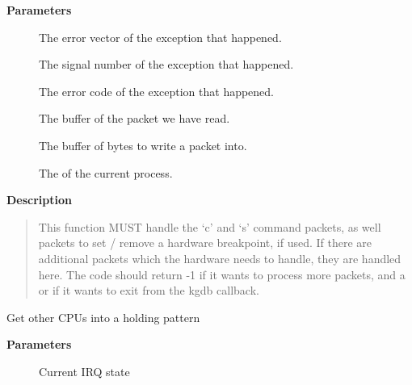 \documentclass[a4paper,8pt,english]{sphinxmanual}
\begin{document}
\textbf{Parameters}
\begin{description}
\item[{}] \leavevmode
The error vector of the exception that happened.

\item[{}] \leavevmode
The signal number of the exception that happened.

\item[{}] \leavevmode
The error code of the exception that happened.

\item[{}] \leavevmode
The buffer of the packet we have read.

\item[{}] \leavevmode
The buffer of  bytes to write a packet into.

\item[{}] \leavevmode
The  of the current process.

\end{description}

\textbf{Description}
\begin{quote}

This function MUST handle the `c' and `s' command packets,
as well packets to set / remove a hardware breakpoint, if used.
If there are additional packets which the hardware needs to handle,
they are handled here.  The code should return -1 if it wants to
process more packets, and a  or  if it wants to exit from the
kgdb callback.
\end{quote}

\begin{fulllineitems}
\label{dev-tools/kgdb:c.kgdb_roundup_cpus}
Get other CPUs into a holding pattern

\end{fulllineitems}


\textbf{Parameters}
\begin{description}
\item[{}] \leavevmode
Current IRQ state

\end{description}
\end{document}
